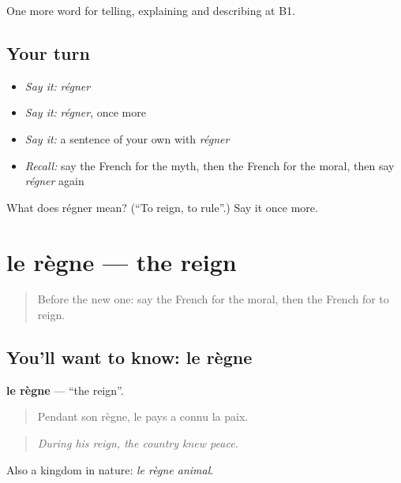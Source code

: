 \begin{grammarlens}[title={What you've built}]
One more word for telling, explaining and describing at B1.
\end{grammarlens}

\subsection*{Your turn}
\begin{itemize}
\raggedright
  \item \emph{Say it:} \emph{régner}
  \item \emph{Say it:} \emph{régner}, once more
  \item \emph{Say it:} a sentence of your own with \emph{régner}
  \item \emph{Recall:} say the French for the myth, then the French for the moral, then say \emph{régner} again
\end{itemize}

\begin{tcolorbox}[breakable,colback=teal!4,colframe=teal!35!black,title={Before you move on}]
What does régner mean? (\textquotedblleft{}To reign, to rule\textquotedblright{}.) Say it once more.
\end{tcolorbox}
\section[le règne]{le règne — the reign}

\label{lesson:FR-C323-regne}



\begin{quote}
Before the new one: say the French for the moral, then the French for to reign.
\end{quote}

\subsection*{You'll want to know: le règne}
\textbf{le règne} — \textquotedblleft{}the reign\textquotedblright{}.

\begin{quote}
Pendant son règne, le pays a connu la paix.
\end{quote}

\begin{quote}
\emph{During his reign, the country knew peace.}
\end{quote}

Also a kingdom in nature: \emph{le règne animal}.

